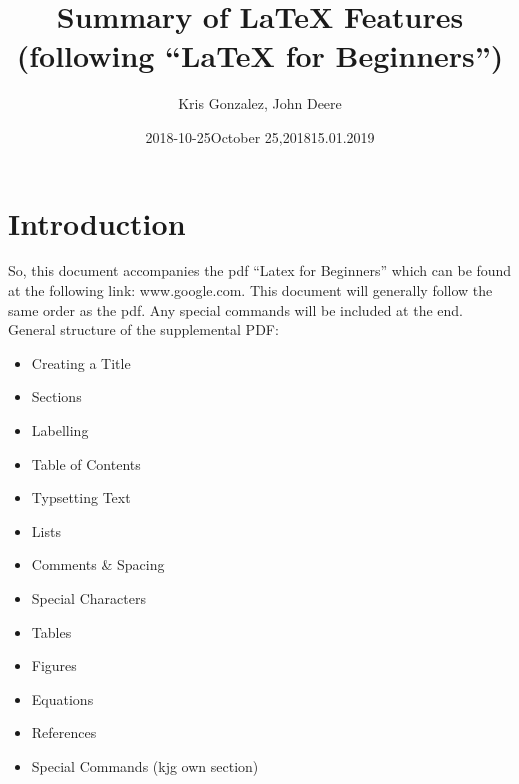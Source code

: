 \title{Summary of LaTeX Features \\
(following ``LaTeX for Beginners'')}
\author{Kris Gonzalez, John Deere} 
\date{2018-10-25}
\date{October 25,2018}
\date{15.01.2019} %
\maketitle %


\newpage
\tableofcontents


\newpage
{} %
\section{Introduction}
\label{Introduction}
So, this document accompanies the pdf ``Latex for Beginners'' which can be found at the following link: www.google.com. This document will generally follow  the same order as the pdf. Any special commands will be included at the end. General structure of the supplemental PDF: 
\begin{itemize}
\itemsep=-0.5em
\item Creating a Title
\item Sections
\item Labelling
\item Table of Contents
\item Typsetting Text
\item Lists
\item Comments \& Spacing
\item Special Characters
\item Tables
\item Figures
\item Equations
\item References
\item Special Commands (kjg own section)
\end{itemize} %

